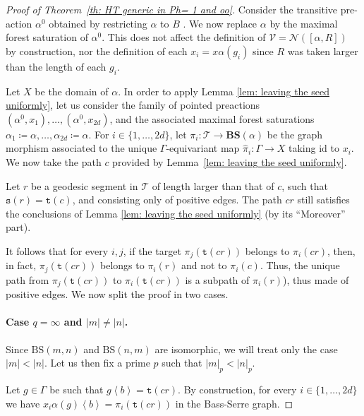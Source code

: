 \documentclass[12pt]{article}
\numberwithin{equation}{section}
\theoremstyle{definition}
\newcommand{\la}{\left\langle}
\newcommand{\ra}{\right\rangle}
\newcommand{\abs}[1]{\left\lvert #1\right\rvert}
\def\id{\mathrm{id}}
\newcommand\BSo{\mathrm{BS}}
\newcommand\BSe{\mathbf{BS}}
\newcommand\Tree{\mathcal{T}}
\newcommand{\source}{\mathtt{s}}
\newcommand{\target}{\mathtt{t}}
\begin{document}
\begin{proof}[Proof of Theorem~\ref{th: HT generic in Ph= 1 and oo}]
	 
	 Consider the transitive pre-action $\alpha^0$ obtained by restricting \( \alpha \) to \(B\) .
	 We now replace \( \alpha \) by the maximal forest saturation of $\alpha^0$. 
	 This does not affect the definition of $\mathcal V=\mathcal N([\alpha,R])$ by construction, 
	 nor the definition of each $x_i=x\alpha(g_i)$ since $R$ was taken larger than the length of each $g_i$. 
	 
	
	
	 Let $X$ be the domain of $\alpha$.
	 In order to apply Lemma \ref{lem: leaving the seed uniformly}, let us consider the family of pointed preactions \((\alpha^0,x_1), \dots,(\alpha^0,x_{2d})\), and the associated
	 maximal forest saturations \(\alpha_1\coloneqq\alpha,\dots,\alpha_{2d} \coloneqq \alpha\).
	 For $i\in\{1,\dots,2d\}$,  let
	$\pi_i:\Tree\to \BSe(\alpha)$ be the graph morphism associated 
	to the unique \( \Gamma \)-equivariant map $\hat\pi_i:\Gamma\to X$ taking $\id$ to $x_i$. We now take the path \( c \) provided by Lemma~\ref{lem: leaving the seed uniformly}.

	Let $r$ be a geodesic segment in $\Tree$ of length larger than that of $c$, such that $\source(r) = \target(c)$, and consisting only of positive edges.
	The path $cr$ still satisfies the conclusions of Lemma \ref{lem: leaving the seed uniformly} (by its ``Moreover'' part).


	 
	It follows that for every \(i,j\), if the target
	\(\pi_j(\target(cr))\) belongs to $\pi_i(cr)$, then, in fact, $\pi_j(\target(cr))$ belongs to $\pi_i(r)$ and not to $\pi_i(c)$.
	Thus, the unique path from \(\pi_j(\target(cr))\) to $\pi_i(\target(cr))$ is a subpath of $\pi_i(r)$), thus made of positive edges.
	We now split the proof in two cases.

	


	\paragraph{Case \(q=\infty\) and $\abs{m} \neq \abs{n}$.}
	Since \(\BSo(m,n)\) and $\BSo(n,m)$ are isomorphic, we will treat only the case \(\abs{m} < \abs{n}\). 
	Let us then fix a prime \(p\) such that $\abs{m}_p < \abs{n}_p$. 
	
	Let \(g\in \Gamma\) be such that $g\la b \ra = \target(cr)$.
	By construction, for every \(i\in\{1,\dots,2d\}\) we have 
	\(x_i\alpha(g) \la b \ra = \pi_i(\target(cr))\) in the Bass-Serre graph.
	
	
	

\end{proof}
\end{document}
